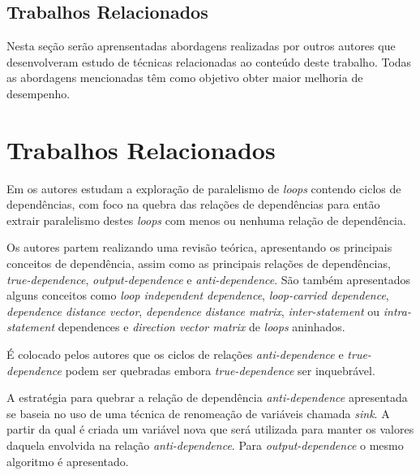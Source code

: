 
\section{Trabalhos Relacionados}

Nesta seção serão aprensentadas abordagens realizadas por outros autores que 
desenvolveram estudo de técnicas relacionadas ao conteúdo deste trabalho.
Todas as abordagens mencionadas têm como objetivo obter maior melhoria de 
desempenho.




\chapter{Trabalhos Relacionados}
Em \cite{Chang:2004} os autores estudam a exploração de paralelismo de
\textit{loops} contendo ciclos de dependências, com foco na quebra das relações 
de dependências para então extrair paralelismo destes \textit{loops} com menos
ou nenhuma relação de dependência.

Os autores partem realizando uma revisão teórica, apresentando os principais
conceitos de dependência, assim como as principais relações de dependências, 
\textit{true-dependence}, \textit{output-dependence} e \textit{anti-dependence}.  
São também apresentados alguns conceitos como \textit{loop independent dependence}, 
\textit{loop-carried dependence}, \textit{dependence distance vector}, 
\textit{dependence distance matrix}, \textit{inter-statement} ou
\textit{intra-statement} dependences e \textit{direction vector matrix} de
\textit{loops} aninhados.

É colocado pelos autores que os ciclos de relações \textit{anti-dependence} e
\textit{true-dependence} podem ser quebradas embora \textit{true-dependence} ser
inquebrável.

A estratégia para quebrar a relação de dependência \textit{anti-dependence}
apresentada se baseia no uso de uma técnica de renomeação de variáveis
chamada \textit{sink}. 
A partir da qual é criada um variável nova que será utilizada para manter os
valores daquela envolvida na relação \textit{anti-dependence}.  
Para \textit{output-dependence} o mesmo algoritmo é apresentado.

